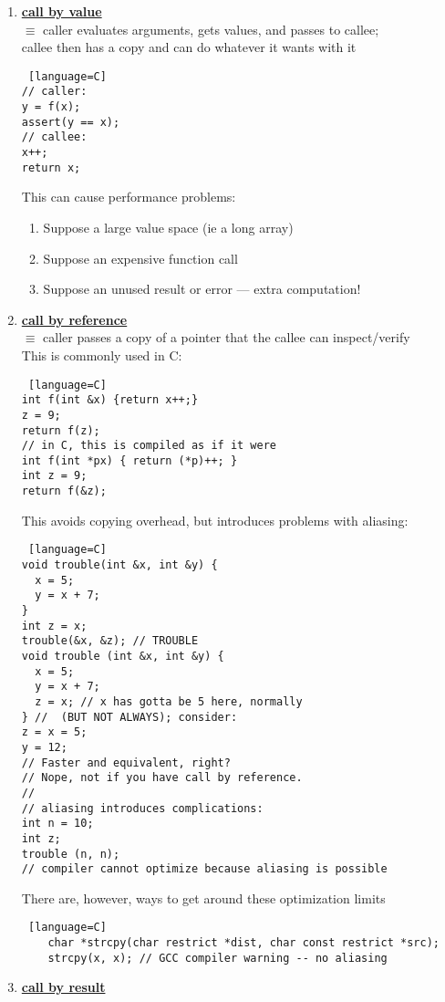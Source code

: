 \documentclass[../../lecture_notes.tex]{subfiles}
\begin{document}
\begin{enumerate} [itemsep=0mm]
	\item \textbf{\underline{call by value}}\\
		$\equiv$ caller evaluates arguments, gets values, and passes to callee;\\
				callee then has a copy and can do whatever it wants with it
		\begin{lstlisting} [language=C]
// caller:
y = f(x);
assert(y == x);
// callee:
x++;
return x;
		\end{lstlisting}
 		This can cause performance problems:
		\begin{enumerate} [itemsep=0mm]
			\item Suppose a large value space (ie a long array)
			\item Suppose an expensive function call
			\item Suppose an unused result or error — extra computation!
		\end{enumerate}
	\item \textbf{\underline{call by reference}}\\
		$\equiv$ caller passes a copy of a pointer that the callee can inspect/verify\\
		This is commonly used in C:
		\begin{lstlisting} [language=C]
int f(int &x) {return x++;}
z = 9;
return f(z);
// in C, this is compiled as if it were
int f(int *px) { return (*p)++; }
int z = 9;
return f(&z);
		\end{lstlisting}
		This avoids copying overhead, but introduces problems with aliasing:
		\begin{lstlisting} [language=C]
void trouble(int &x, int &y) {
  x = 5;
  y = x + 7;
}
int z = x;
trouble(&x, &z); // TROUBLE
void trouble (int &x, int &y) {
  x = 5;
  y = x + 7;
  z = x; // x has gotta be 5 here, normally
} //  (BUT NOT ALWAYS); consider:
z = x = 5; 
y = 12; 
// Faster and equivalent, right?
// Nope, not if you have call by reference.
//
// aliasing introduces complications:
int n = 10;
int z;
trouble (n, n); 
// compiler cannot optimize because aliasing is possible
	\end{lstlisting}
	There are, however, ways to get around these optimization limits
	\begin{lstlisting} [language=C]
	char *strcpy(char restrict *dist, char const restrict *src);
	strcpy(x, x); // GCC compiler warning -- no aliasing
		\end{lstlisting}
	\item \textbf{\underline{call by result}}\\

\end{enumerate}
\end{document}

